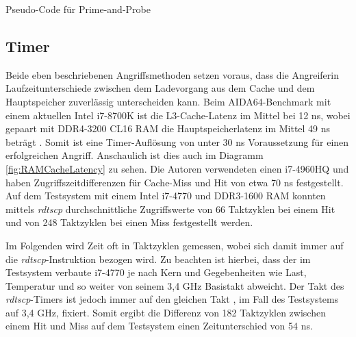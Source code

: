 
\begin{algorithm}[h]
\DontPrintSemicolon
\caption{Pseudo-Code für Prime-and-Probe}
\label{alg:prime_and_pribe}


\end{algorithm}




\subsection{Timer}

Beide eben beschriebenen Angriffsmethoden setzen voraus, dass die Angreiferin Laufzeitunterschiede zwischen dem Ladevorgang aus dem Cache und dem Hauptspeicher zuverlässig unterscheiden kann. Beim AIDA64-Benchmark mit einem aktuellen Intel i7-8700K ist die L3-Cache-Latenz im Mittel bei 12 ns, wobei gepaart mit DDR4-3200 CL16 RAM die Hauptspeicherlatenz im Mittel 49 ns beträgt \cite{i78700kLatency}. Somit ist eine Timer-Auflösung von unter 30 ns Voraussetzung für einen erfolgreichen Angriff. Anschaulich ist dies auch im Diagramm \ref{fig:RAMCacheLatency} zu sehen. Die Autoren verwendeten einen i7-4960HQ und haben Zugriffszeitdifferenzen für Cache-Miss und Hit von etwa 70 ns festgestellt. 
Auf dem Testsystem mit einem Intel i7-4770 und DDR3-1600 RAM konnten mittels \textit{rdtscp} durchschnittliche Zugriffswerte von 66 Taktzyklen bei einem Hit und von 248 Taktzyklen bei einen Miss festgestellt werden.

Im Folgenden wird Zeit oft in Taktzyklen gemessen, wobei sich damit immer auf die \textit{rdtscp}-Instruktion bezogen wird.
Zu beachten ist hierbei, dass der im Testsystem verbaute i7-4770 je nach Kern und Gegebenheiten wie Last, Temperatur und so weiter von seinem 3,4 GHz Basistakt abweicht.
Der Takt des \textit{rdtscp}-Timers ist jedoch immer auf den gleichen Takt \cite{IntelManualRDTSCP}, im Fall des Testsystems auf 3,4 GHz, fixiert.
Somit ergibt die Differenz von 182 Taktzyklen zwischen einem Hit und Miss auf dem Testsystem einen Zeitunterschied von 54 ns.

